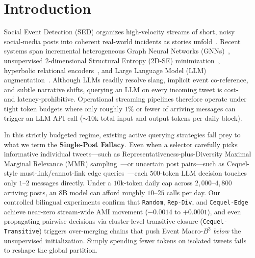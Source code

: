\section{Introduction}
\label{sec:intro}

Social Event Detection (SED) organizes high-velocity streams of short, noisy social-media posts into coherent real-world incidents as stories unfold~\citep{mcminn2013building,mazoyer2020french}. Recent systems span incremental heterogeneous Graph Neural Networks (GNNs)~\citep{cao2021kpgnn}, unsupervised 2-dimensional Structural Entropy (2D-SE) minimization~\citep{cao2024hisevent}, hyperbolic relational encoders~\citep{li2024rplmsed,yu2025hypersed}, and Large Language Model (LLM) augmentation~\citep{qiu2025lsed,qiu2026lhg,liu2026ragsede}. Although LLMs readily resolve slang, implicit event co-reference, and subtle narrative shifts, querying an LLM on every incoming tweet is cost- and latency-prohibitive. Operational streaming pipelines therefore operate under tight token budgets where only roughly $1\%$ or fewer of arriving messages can trigger an LLM API call ($\sim 10\text{k}$ total input and output tokens per daily block).

In this strictly budgeted regime, existing active querying strategies fall prey to what we term the \textbf{Single-Post Fallacy}. Even when a selector carefully picks informative individual tweets---such as Representativeness-plus-Diversity Maximal Marginal Relevance (MMR) sampling~\citep{liu2026ragsede,carbonell1998mmr}---or uncertain post pairs---such as Cequel-style must-link/cannot-link edge queries~\citep{wang2025cequel}---each $500$-token LLM decision touches only $1$--$2$ messages directly. Under a $10\text{k}$-token daily cap across $2{,}000$--$4{,}800$ arriving posts, an 8B model can afford roughly $10$--$25$ calls per day. Our controlled bilingual experiments confirm that \texttt{Random}, \texttt{Rep-Div}, and \texttt{Cequel-Edge} achieve near-zero stream-wide AMI movement ($-0.0014$ to $+0.0001$), and even propagating pairwise decisions via cluster-level transitive closure (\texttt{Cequel-Transitive}) triggers over-merging chains that push Event Macro-$B^3$ \emph{below} the unsupervised initialization. Simply spending fewer tokens on isolated tweets fails to reshape the global partition.


